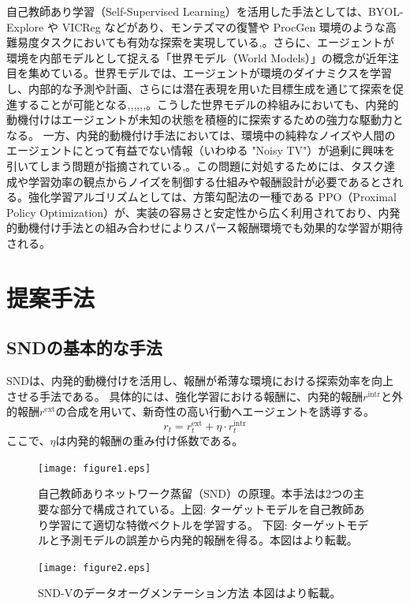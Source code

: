 自己教師あり学習（Self-Supervised Learning）を活用した手法としては、BYOL-Explore や VICReg などがあり、モンテズマの復讐や ProcGen 環境のような高難易度タスクにおいても有効な探索を実現している\cite{BYOL},\cite{SEMRE}。さらに、エージェントが環境を内部モデルとして捉える「世界モデル（World Models）」の概念が近年注目を集めている\cite{WM}\cite{CB}。世界モデルでは、エージェントが環境のダイナミクスを学習し、内部的な予測や計画、さらには潜在表現を用いた目標生成を通じて探索を促進することが可能となる\cite{IMRL},\cite{IMRL2},\cite{LTP},\cite{WDM},\cite{AWMPC},\cite{LLD},\cite{DAG}。こうした世界モデルの枠組みにおいても、内発的動機付けはエージェントが未知の状態を積極的に探索するための強力な駆動力となる。
一方、内発的動機付け手法においては、環境中の純粋なノイズや人間のエージェントにとって有益でない情報（いわゆる "Noisy TV"）が過剰に興味を引いてしまう問題が指摘されている\cite{IM},\cite{CB}。この問題に対処するためには、タスク達成や学習効率の観点からノイズを制御する仕組みや報酬設計が必要であるとされる。強化学習アルゴリズムとしては、方策勾配法の一種である PPO（Proximal Policy Optimization）が、実装の容易さと安定性から広く利用されており、内発的動機付け手法との組み合わせによりスパース報酬環境でも効果的な学習が期待される\cite{PPO}。

\section{提案手法}
\subsection{SNDの基本的な手法}
SNDは、内発的動機付けを活用し、報酬が希薄な環境における探索効率を向上させる手法である。
具体的には、強化学習における報酬に、内発的報酬\(r^{\text{intr}}\)と外的報酬\(r^{\text{ext}}\)の合成を用いて、新奇性の高い行動へエージェントを誘導する。
\[
 r_t = r^{\text{ext}}_{t} + \eta \cdot r^{\text{intr}}_{t}
\]
ここで、\(\eta\)は内発的報酬の重み付け係数である。
\begin{figure}[t]
   \centering
   \texttt{[image: figure1.eps]}
   \caption{自己教師ありネットワーク蒸留（SND）の原理。本手法は2つの主要な部分で構成されている。上図: ターゲットモデルを自己教師あり学習にて適切な特徴ベクトルを学習する。 下図: ターゲットモデルと予測モデルの誤差から内発的報酬を得る。本図は\cite{SND}より転載。}\label{fig1:figure1}
\end{figure}
\begin{figure}[t]
   \centering
   \texttt{[image: figure2.eps]}
   \caption{SND-Vのデータオーグメンテーション方法 本図は\cite{SND}より転載。}\label{fig2:figure2}
\end{figure}


